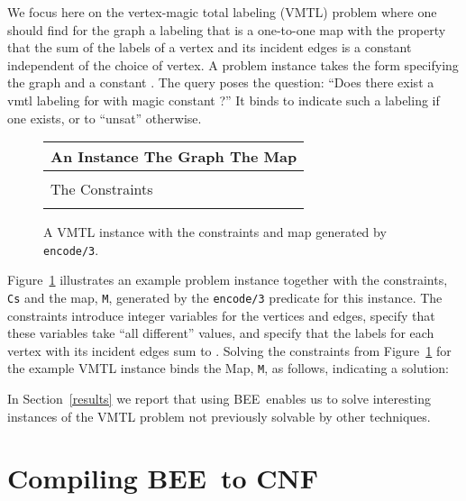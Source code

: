 \documentclass{tlp}
\newcommand{\bee}{\textsf{BEE}}
\begin{document}
We focus here on the vertex-magic total labeling (VMTL) problem where
one should find for the graph  a labeling that is a
one-to-one map  with the
property that the sum of the labels of a vertex and its incident edges
is a constant  independent of the choice of vertex.
A problem instance takes the form  specifying the graph 
and a constant . The query 
poses the question: ``Does there exist a vmtl labeling for  with
magic constant ?'' It binds  to indicate such a
labeling if one exists, or to ``unsat'' otherwise.
\begin{figure}[t]
  \centering
  \begin{tabular}{l}
\hline
\hspace{1cm} An Instance \hspace{2cm} The Graph \hspace{2cm} The Map\\
\hline
\quad\qquad  
\qquad\quad\\
\hline
\hspace{1cm} The Constraints\\
\hline
\qquad\\
\hline
\end{tabular}

  \caption{A VMTL instance with the constraints and map generated by
    \texttt{encode/3}. }
  \label{fig:vmtl-instance}
\end{figure}
Figure~\ref{fig:vmtl-instance} illustrates an example problem instance
together with the constraints, \texttt{Cs} and the map, \texttt{M},
generated by the \texttt{encode/3} predicate for this instance.
The constraints introduce integer variables for the vertices and
edges, specify that these variables take  ``all different'' values,
and specify that the labels for each vertex with its incident edges
sum to .
Solving the constraints from Figure~\ref{fig:vmtl-instance} for the
example VMTL instance binds the Map, \texttt{M}, as follows,
indicating a solution:

In Section~\ref{results} we report that using \bee\ enables
us to solve interesting instances of the VMTL problem not previously
solvable by other techniques.




\section{Compiling \bee\ to CNF}
\label{sec:compiling}
\end{document}
